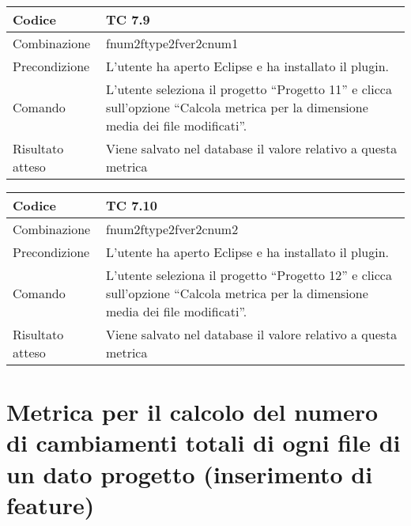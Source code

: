 \begin{table}[ht]
\begin{tabular}{|p{3cm}|p{9cm}|}
\hline
\cellcolor{lightgray}Codice				& TC 7.9								\\
\hline
\cellcolor{lightgray}Combinazione		& fnum2ftype2fver2cnum1 									\\
\hline
\cellcolor{lightgray}Precondizione		& L'utente ha aperto Eclipse e ha installato il plugin.								\\
\hline
\cellcolor{lightgray}Comando			& L'utente seleziona il progetto ``Progetto 11''  e clicca sull'opzione ``Calcola metrica per la dimensione media dei file modificati''.	\\
\hline
\cellcolor{lightgray}Risultato atteso	& Viene salvato nel database il valore relativo a questa metrica	\\
\hline
\end{tabular}
\end{table}

\begin{table}[ht]
\begin{tabular}{|p{3cm}|p{9cm}|}
\hline
\cellcolor{lightgray}Codice				& TC 7.10								\\
\hline
\cellcolor{lightgray}Combinazione		& fnum2ftype2fver2cnum2 									\\
\hline
\cellcolor{lightgray}Precondizione		& L'utente ha aperto Eclipse e ha installato il plugin.									\\
\hline
\cellcolor{lightgray}Comando			& L'utente seleziona il progetto ``Progetto 12''  e clicca sull'opzione ``Calcola metrica per la dimensione media dei file modificati''.	\\
\hline
\cellcolor{lightgray}Risultato atteso	& Viene salvato nel database il valore relativo a questa metrica	\\
\hline
\end{tabular}
\end{table}

\clearpage

\section{Metrica per il calcolo del numero di cambiamenti totali di ogni file di un dato progetto (inserimento di feature)}

